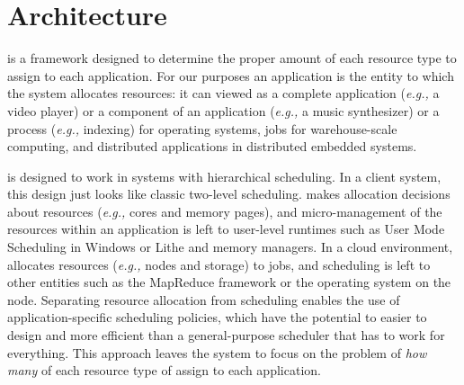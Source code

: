 \section{\pacora Architecture}




\pacora is a framework designed to determine the proper amount of each resource type to assign to each application.  For our purposes an application is the entity to which the system allocates resources: it can viewed as a complete application (\emph{e.g.,} a video player) or a component of an application (\emph{e.g.,} a music synthesizer) or a process (\emph{e.g.,} indexing) for operating systems, jobs for warehouse-scale computing, and distributed applications in distributed embedded systems. 

\pacora is designed to work in systems with hierarchical scheduling.  In a client system, this design just looks like classic two-level scheduling.  \pacora makes allocation decisions about resources (\emph{e.g.,} cores and memory pages), and micro-management of the resources within an application is left to user-level runtimes such as User Mode Scheduling in Windows\cite{um_sched} or Lithe\cite{lithe} and memory managers.  In a cloud environment, \pacora allocates resources (\emph{e.g.,} nodes and storage) to jobs, and scheduling is left to other entities such as the MapReduce framework\cite{mapreduce} or the operating system on the node.  Separating resource allocation from scheduling enables the use of application-specific scheduling policies, which have the potential to easier to design and more efficient than a general-purpose scheduler that has to work for everything.   This approach leaves the system to focus on the problem of \emph{how many} of each resource type of assign to each application. 

